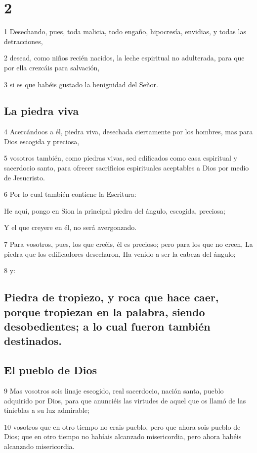 \chapter{2}

\par 1 Desechando, pues, toda malicia, todo engaño, hipocresía, envidias, y todas las detracciones,
\par 2 desead, como niños recién nacidos, la leche espiritual no adulterada, para que por ella crezcáis para salvación,
\par 3 si es que habéis gustado la benignidad del Señor.

\section*{La piedra viva}

\par 4 Acercándoos a él, piedra viva, desechada ciertamente por los hombres, mas para Dios escogida y preciosa,
\par 5 vosotros también, como piedras vivas, sed edificados como casa espiritual y sacerdocio santo, para ofrecer sacrificios espirituales aceptables a Dios por medio de Jesucristo.
\par 6 Por lo cual también contiene la Escritura:
\par He aquí, pongo en Sion la principal piedra del ángulo, escogida, preciosa;
\par Y el que creyere en él, no será avergonzado.
\par 7 Para vosotros, pues, los que creéis, él es precioso; pero para los que no creen, La piedra que los edificadores desecharon, Ha venido a ser la cabeza del ángulo;
\par 8 y:
\section*{Piedra de tropiezo, y roca que hace caer, porque tropiezan en la palabra, siendo desobedientes; a lo cual fueron también destinados.}

\section*{El pueblo de Dios}

\par 9 Mas vosotros sois linaje escogido, real sacerdocio, nación santa, pueblo adquirido por Dios, para que anunciéis las virtudes de aquel que os llamó de las tinieblas a su luz admirable;
\par 10 vosotros que en otro tiempo no erais pueblo, pero que ahora sois pueblo de Dios; que en otro tiempo no habíais alcanzado misericordia, pero ahora habéis alcanzado misericordia.

